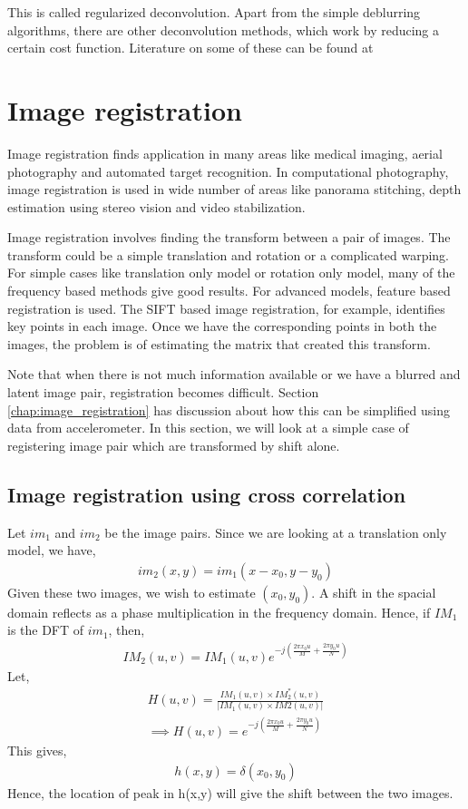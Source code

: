 \documentclass[BTech]{iitmdiss}
\begin{document}
This is called regularized deconvolution. Apart from the simple deblurring
algorithms, there are other deconvolution methods, which work by reducing
a certain cost function. Literature on some of these can be found at
\cite{longrichardson,wang2009robust,bioucas2006total}

\section{Image registration}
\label{basic_theory:registration}
Image registration finds application in many areas like medical imaging,
aerial photography and automated target recognition. In computational
photography, image registration is used in wide number of areas like panorama
stitching, depth estimation using stereo vision and video stabilization.

Image registration involves finding the transform between a pair of 
images. The transform could be a simple translation and rotation or a
complicated warping. For simple cases like translation only model or 
rotation only model, many of the frequency based methods give good 
results. For advanced models, feature based registration is used. The 
SIFT based image registration, for example, identifies key points in
each image. Once we have the corresponding points in both the images,
the problem is of estimating the matrix that created this transform.

Note that when there is not much information available or we have a 
blurred and latent image pair, registration becomes difficult. Section
\ref{chap:image_registration} has discussion about how this can be 
simplified using data from accelerometer. In this section, we will look
at a simple case of registering image pair which are transformed by shift
alone. %

\subsection{Image registration using cross correlation}
Let $im_1$ and $im_2$ be the image pairs. Since we are looking at a 
translation only model, we have,
\begin{align*}
im_2(x,y)=im_1(x-x_0, y-y_0)
\end{align*}
Given these two images, we wish to estimate $(x_0,y_0)$. A shift in the
spacial domain reflects as a phase multiplication in the frequency domain.
Hence, if $IM_1$ is the DFT of $im_1$, then,
\begin{align*}
IM_2(u,v) = IM_1(u,v)e^{-j(\frac{2{\pi}x_0u}{M}+\frac{2{\pi}y_0u}{N})}
\end{align*}
Let,
\begin{align*}
H(u,v) = \frac{IM_1(u,v){\times}IM_2^*(u,v)}{|IM_1(u,v){\times}IM2(u,v)|}\\
\implies H(u,v) = e^{-j(\frac{2{\pi}x_0u}{M}+\frac{2{\pi}y_0u}{N})}
\end{align*}
This gives,
\begin{align*}
h(x,y) = \delta(x_0, y_0)
\end{align*}
Hence, the location of peak in h(x,y) will give the shift between the 
two images. 
\end{document}
